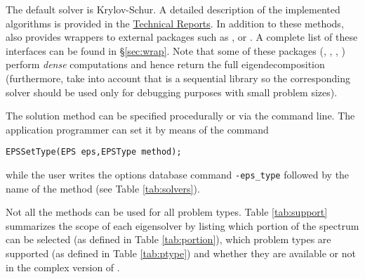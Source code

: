 The default solver is Krylov-Schur. A detailed description of the implemented algorithms is provided in the \hyperlink{str}{\slepc Technical Reports}. In addition to these methods, \slepc also provides wrappers to external packages such as \arpack, or \trlan. A complete list of these interfaces can be found in \S\ref{sec:wrap}. Note that some of these packages (\lapack, \scalapack, \elpa, \elemental) perform \emph{dense} computations and hence return the full eigendecomposition (furthermore, take into account that \lapack is a sequential library so the corresponding solver should be used only for debugging purposes with small problem sizes).

The solution method can be specified procedurally or via the command line. The application programmer can set it by means of the command
        \begin{Verbatim}[fontsize=\small]
        EPSSetType(EPS eps,EPSType method);
        \end{Verbatim}
while the user writes the options database command \Verb!-eps_type! followed by the name of the method (see Table \ref{tab:solvers}).

Not all the methods can be used for all problem types. Table \ref{tab:support} summarizes the scope of each eigensolver by listing which portion of the spectrum can be selected (as defined in Table \ref{tab:portion}), which problem types are supported (as defined in Table \ref{tab:ptype}) and whether they are available or not in the complex version of \slepc. %

